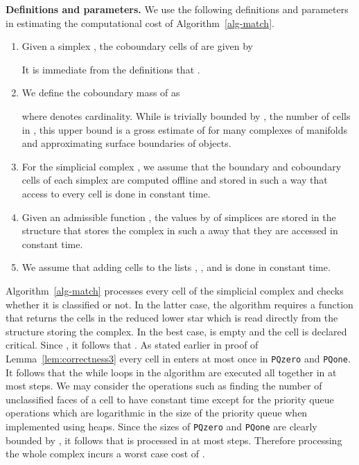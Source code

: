 \documentclass[12pt]{article}
\begin{document}
{\bf Definitions and parameters.} We use the following definitions and parameters in estimating the computational cost of Algorithm~\ref{alg-match}.
\begin{enumerate}
 \item Given a simplex , the coboundary cells of  are given by

It is immediate from the definitions that .

\item We define the coboundary mass  of  as

where  denotes cardinality. While  is trivially bounded by , the number of cells in ,
this upper bound is a gross estimate of  for many complexes of manifolds and approximating surface boundaries of objects.

\item For the simplicial complex , we assume that the boundary and coboundary cells of each simplex
are computed offline and stored in such a way that access to every cell is done in constant time.

\item Given an admissible function , the values by  of simplices  are stored in the structure
that stores the complex  in such a away that they are accessed in constant time.

\item We assume that adding cells to the lists , , and  is done in constant time.
\end{enumerate}


Algorithm~\ref{alg-match} processes every cell  of the simplicial complex  and checks whether it is classified or not.
In the latter case, the algorithm requires a function that returns the cells in the reduced lower star  which
is read directly from the structure storing the complex. In the best case,  is empty and the cell is declared critical.
Since , it follows that .
As stated earlier in proof of Lemma~\ref{lem:correctness3} every cell in  enters at most once in \texttt{PQzero} and \texttt{PQone}.
It follows that the while loops in the algorithm are executed all together in at most  steps. We may consider the operations such as finding
the number of unclassified faces of a cell to have constant time except for the priority queue operations which are logarithmic in the size of the priority queue
when implemented using heaps. Since the sizes of \texttt{PQzero} and \texttt{PQone} are clearly bounded by , it follows that  is
processed in at most  steps.
Therefore processing the whole complex incurs a worst case cost of .
\end{document}
